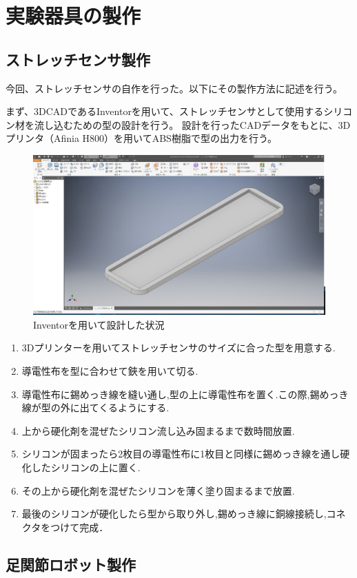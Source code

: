 \newpage

\section{実験器具の製作}
\subsection{ストレッチセンサ製作}
今回、ストレッチセンサの自作を行った。以下にその製作方法に記述を行う。

まず、3DCADであるInventorを用いて、ストレッチセンサとして使用するシリコン材を流し込むための型の設計を行う。
設計を行ったCADデータをもとに、3Dプリンタ（Afinia H800）を用いてABS樹脂で型の出力を行う。
\begin{figure}[h]
    \begin{center}
     \includegraphics[width=0.5\columnwidth,clip]{./2_measurement/inventor.eps}
     \caption{Inventorを用いて設計した状況}
     \label{fig:legMuscle}
    \end{center}
\end{figure}

\begin{enumerate}
    \item 3Dプリンターを用いてストレッチセンサのサイズに合った型を用意する.
    \item 導電性布を型に合わせて鋏を用いて切る.
    \item 導電性布に錫めっき線を縫い通し,型の上に導電性布を置く.この際,錫めっき線が型の外に出てくるようにする.
    \item 上から硬化剤を混ぜたシリコン流し込み固まるまで数時間放置.
    \item シリコンが固まったら2枚目の導電性布に1枚目と同様に錫めっき線を通し硬化したシリコンの上に置く.
    \item その上から硬化剤を混ぜたシリコンを薄く塗り固まるまで放置.
    \item 最後のシリコンが硬化したら型から取り外し,錫めっき線に銅線接続し,コネクタをつけて完成．
\end{enumerate}
\subsection{足関節ロボット製作}

